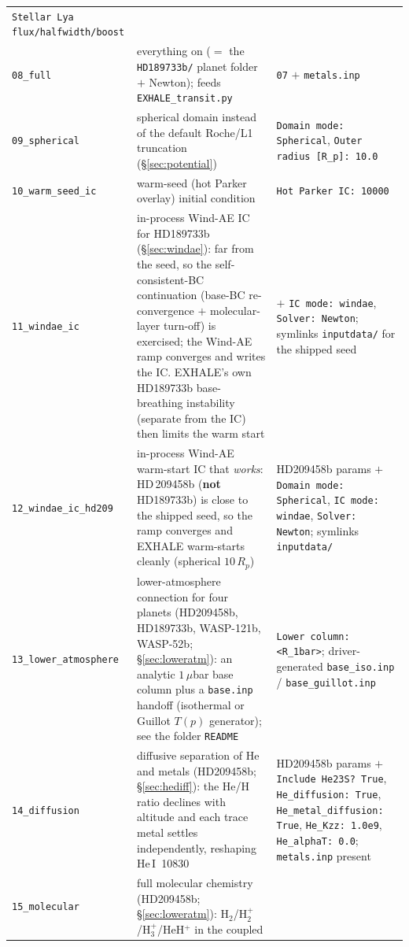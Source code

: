 \documentclass[english,a4paper]{my_memo}
\begin{document}
{\begin{longtable}{@{}lp{4.6cm}p{5.6cm}@{}}
  \texttt{Stellar Lya flux/halfwidth/boost} \\
\texttt{08\_full} & everything on ($=$ the \texttt{HD189733b/} planet folder
  $+$ Newton); feeds \texttt{EXHALE\_transit.py} & \texttt{07} $+$ \texttt{metals.inp} \\
\texttt{09\_spherical} & spherical domain instead of the default Roche/L1
  truncation (\S\ref{sec:potential}) & \texttt{Domain mode: Spherical},
  \texttt{Outer radius [R\_p]: 10.0} \\
\texttt{10\_warm\_seed\_ic} & warm-seed (hot Parker overlay) initial
  condition & \texttt{Hot Parker IC: 10000} \\
\texttt{11\_windae\_ic} & in-process Wind-AE IC for HD189733b
  (\S\ref{sec:windae}): far from the seed, so the self-consistent-BC continuation (base-BC
  re-convergence $+$ molecular-layer turn-off) is exercised; the Wind-AE ramp
  converges and writes the IC. EXHALE's own HD189733b base-breathing
  instability (separate from the IC) then limits the warm start &
  $+$ \texttt{IC mode: windae}, \texttt{Solver: Newton}; symlinks
  \texttt{inputdata/} for the shipped seed \\
\texttt{12\_windae\_ic\_hd209} & in-process Wind-AE warm-start IC that
  \emph{works}: HD\,209458b (\textbf{not} HD189733b) is close to the
  shipped seed, so the ramp converges and EXHALE warm-starts cleanly
  (spherical $10\,R_p$) & HD209458b params $+$ \texttt{Domain mode:
  Spherical}, \texttt{IC mode: windae}, \texttt{Solver: Newton};
  symlinks \texttt{inputdata/} \\
\texttt{13\_lower\_atmosphere} & lower-atmosphere connection for four planets
  (HD209458b, HD189733b, WASP-121b, WASP-52b; \S\ref{sec:loweratm}): an
  analytic $1\,\mu$bar base column plus a \texttt{base.inp} handoff
  (isothermal or Guillot $T(p)$ generator); see the folder \texttt{README} &
  \texttt{Lower column: <R\_1bar>}; driver-generated
  \texttt{base\_iso.inp} / \texttt{base\_guillot.inp} \\
\texttt{14\_diffusion} & diffusive separation of He and metals (HD209458b;
  \S\ref{sec:hediff}): the He/H ratio declines with altitude and each trace
  metal settles independently, reshaping He\,I~10830 & HD209458b params $+$
  \texttt{Include He23S? True}, \texttt{He\_diffusion: True},
  \texttt{He\_metal\_diffusion: True}, \texttt{He\_Kzz: 1.0e9},
  \texttt{He\_alphaT: 0.0}; \texttt{metals.inp} present \\
\texttt{15\_molecular} & full molecular chemistry (HD209458b;
  \S\ref{sec:loweratm}): H$_2$/H$_2^+$/H$_3^+$/HeH$^+$ in the coupled

\end{longtable}}
\end{document}
